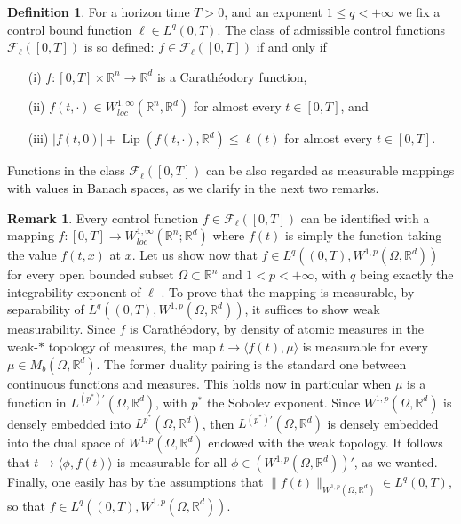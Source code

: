 \documentclass[11pt]{article}
\theoremstyle{plain}
\theoremstyle{definition}
\newtheorem{definition}[theorem]{Definition}
\newtheorem{remark}[theorem]{Remark}
\theoremstyle{remark}
\numberwithin{equation}{section}
\newcommand{\R}{{\mathbb R}}
\newcommand{\Rn}{{\R}^n}
\newcommand{\Om}{\Omega}
\begin{document}
\begin{definition}\label{def:admcontr}
For a horizon time $T>0$, and an exponent $1\le q<+\infty$ we fix a control bound function $\ell \in L^q(0,T)$. The class of admissible control functions $\mathcal F_\ell([0,T])$
is so defined: $f \in \mathcal F_\ell([0,T])$ if and only if 
\begin{itemize}
\item[(i)] $f: [0,T] \times \mathbb R^n \to \mathbb R^d$ is a Carath{\'e}odory function, 
\item[(ii)] $f(t, \cdot) \in W^{1,\infty}_{loc}(\mathbb R^n, \mathbb R^d)$  for almost every $t \in [0,T]$, and
\item[(iii)] $|f(t,0)| + \operatorname{Lip}(f(t,\cdot),\mathbb R^d) \leq \ell(t)$ for almost every $t \in [0,T]$.
\end{itemize}
\end{definition}
Functions in the class $\mathcal F_\ell([0, T])$ can be also regarded as measurable mappings with values in Banach spaces, as we clarify in the next two remarks.

\begin{remark}\label{rem:a}
Every control function $f\in \mathcal F_\ell([0,T])$ can be identified with a mapping $f:[0, T] \to W^{1,\infty}_{loc}(\Rn;\R^d)$ where $f(t)$ is simply the function taking the value $f(t,x)$ at $x$. Let us show now that $f \in L^q((0,T), W^{1,p}(\Om,\R^d))$ for every open bounded subset $\Om \subset \Rn$ and $1< p <+\infty$, with $q$ being exactly the integrability exponent of $\ell$ . To prove that the mapping is measurable, by separability of $L^q((0,T), W^{1,p}(\Om,\R^d))$, it suffices to show weak measurability.
Since $f$ is Carath{\'e}odory, by density of atomic measures in the weak-$*$ topology of measures, the map $t \to \langle f(t), \mu \rangle$ is measurable for every $\mu \in M_b(\Om,\R^d)$. The former duality pairing is the standard one between continuous functions and measures. This holds now in particular when $\mu$ is a function in $L^{(p^{*})'}(\Om, \R^d)$, with $p^{*}$ the Sobolev exponent. Since $W^{1,p}(\Om,\R^d)$ is densely embedded into $L^{p^{*}}(\Om, \R^d)$, then $L^{(p^{*})'}(\Om, \R^d)$ is densely embedded into the dual space of $W^{1,p}(\Om,\R^d)$ endowed with the weak topology. It follows that $t \to \langle \phi, f(t)\rangle$ is measurable for all $\phi \in (W^{1,p}(\Om,\R^d))'$, as we wanted. Finally, one easily has by the assumptions that $\|f(t)\|_{W^{1,p}(\Om,\R^d)} \in L^q(0, T)$, so that $f \in L^q((0,T), W^{1,p}(\Om,\R^d))$.
\end{remark}
\end{document}
